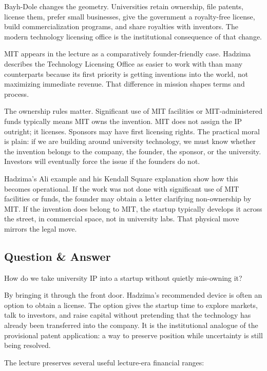 Bayh-Dole changes the geometry. Universities retain ownership, file patents, license them, prefer small businesses, give the government a royalty-free license, build commercialization programs, and share royalties with inventors. The modern technology licensing office is the institutional consequence of that change.

MIT appears in the lecture as a comparatively founder-friendly case. Hadzima describes the Technology Licensing Office as easier to work with than many counterparts because its first priority is getting inventions into the world, not maximizing immediate revenue. That difference in mission shapes terms and process.

The ownership rules matter. Significant use of MIT facilities or MIT-administered funds typically means MIT owns the invention. MIT does not assign the IP outright; it licenses. Sponsors may have first licensing rights. The practical moral is plain: if we are building around university technology, we must know whether the invention belongs to the company, the founder, the sponsor, or the university. Investors will eventually force the issue if the founders do not.

Hadzima's Ali example and his Kendall Square explanation show how this becomes operational. If the work was not done with significant use of MIT facilities or funds, the founder may obtain a letter clarifying non-ownership by MIT. If the invention does belong to MIT, the startup typically develops it across the street, in commercial space, not in university labs. That physical move mirrors the legal move.

\subsection{Question \& Answer}

How do we take university IP into a startup without quietly mis-owning it?

By bringing it through the front door. Hadzima's recommended device is often an option to obtain a license. The option gives the startup time to explore markets, talk to investors, and raise capital without pretending that the technology has already been transferred into the company. It is the institutional analogue of the provisional patent application: a way to preserve position while uncertainty is still being resolved.

The lecture preserves several useful lecture-era financial ranges:

